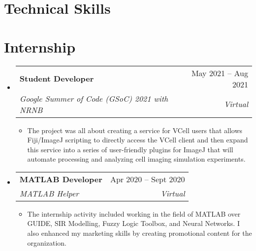 \documentclass[letterpaper,11pt]{article}
\makeatletter
\newcommand{\resumeItem}[1]{
  \item\small{
    {#1 \vspace{-2pt}}
  }
}
\newcommand{\resumeSubheading}[4]{
  \vspace{-2pt}\item
    \begin{tabular*}{0.97\textwidth}[t]{l@{\extracolsep{\fill}}r}
      \textbf{#1} & #2 \\
      \textit{\small#3} & \textit{\small #4} \\
    \end{tabular*}\vspace{-7pt}
}
\newcommand{\resumeSubHeadingListStart}{\begin{itemize}[leftmargin=0.15in, label={}]}
\newcommand{\resumeSubHeadingListEnd}{\end{itemize}}
\newcommand{\resumeItemListStart}{\begin{itemize}}
\newcommand{\resumeItemListEnd}{\end{itemize}\vspace{-5pt}}
\makeatother
\begin{document}
\section{Technical Skills}
    
\section{Internship}
  \resumeSubHeadingListStart

    \resumeSubheading
      {Student Developer}{May 2021 -- Aug 2021}
      {Google Summer of Code (GSoC) 2021 with NRNB }{Virtual}
      \resumeItemListStart
        \resumeItem{The project was all about creating a service for VCell users that allows Fiji/ImageJ scripting to directly access the VCell client and then expand this service into a series of user-friendly plugins for ImageJ that will automate processing and analyzing cell imaging simulation experiments.}
        \resumeItemListEnd
        \resumeSubheading
    {MATLAB Developer}{Apr 2020 -- Sept 2020}
      {MATLAB Helper}{Virtual}
      \resumeItemListStart
        \resumeItem{The internship activity included working in the field of MATLAB over GUIDE, SIR Modelling, Fuzzy Logic Toolbox, and Neural Networks. I also enhanced my marketing skills by creating promotional content for the organization.}
      \resumeItemListEnd
      

\end{itemize}
\end{document}
